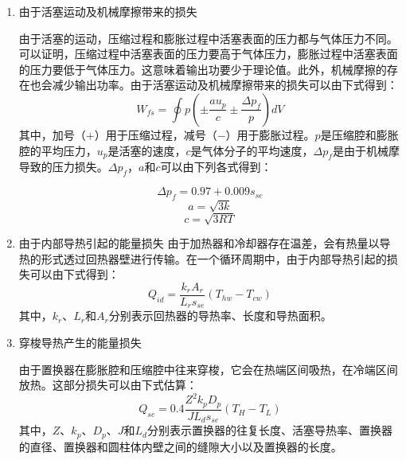\begin{enumerate}[label=(\arabic*)]
\item 由于活塞运动及机械摩擦带来的损失

由于活塞的运动，压缩过程和膨胀过程中活塞表面的压力都与气体压力不同。可以证明，压缩过程中活塞表面的压力要高于气体压力，膨胀过程中活塞表面的压力要低于气体压力。这意味着输出功要少于理论值。此外，机械摩擦的存在也会减少输出功率。由于活塞运动及机械摩擦带来的损失可以由下式得到\cite{Babaelahi2015}：
\begin{equation}
	W_{fs} = \oint p(\pm\frac{au_p}{c}\pm\frac{\Delta p_f}{p})dV
\end{equation}
其中，加号（$+$）用于压缩过程，减号（$-$）用于膨胀过程。$p$是压缩腔和膨胀腔的平均压力，$u_p$是活塞的速度，$c$是气体分子的平均速度，$\Delta p_f$是由于机械摩导致的压力损失。$\Delta p_f$，$a$和$c$可以由下列各式得到：\cite{Heywood1988}

\begin{equation}
	\Delta p_f = 0.97+0.009s_{se}
\end{equation}
\begin{equation}
	a = \sqrt{3k}
\end{equation}
\begin{equation}
	c = \sqrt{3RT}
\end{equation}

\item 由于内部导热引起的能量损失
由于加热器和冷却器存在温差，会有热量以导热的形式透过回热器壁进行传输\cite{Strauss2010}。在一个循环周期中，由于内部导热引起的损失可以由下式得到：
\begin{equation}
	Q_{id} = \frac{k_rA_r}{L_rs_{se}}(T_{hw} - T_{cw})
\end{equation}
其中，$k_r$、$L_r$和$A_r$分别表示回热器的导热率、长度和导热面积。

\item 穿梭导热产生的能量损失

由于置换器在膨胀腔和压缩腔中往来穿梭，它会在热端区间吸热，在冷端区间放热。这部分损失可以由下式估算\cite{Timoumi2008}：
\begin{equation}
	Q_{sc} = 0.4\frac{Z^2k_pD_p}{JL_ds_{se}}(T_{H} - T_{L})
\end{equation}
其中，$Z$、$k_p$、$D_p$、$J$和$L_d$分别表示置换器的往复长度、活塞导热率、置换器的直径、置换器和圆柱体内壁之间的缝隙大小以及置换器的长度。

\end{enumerate}

